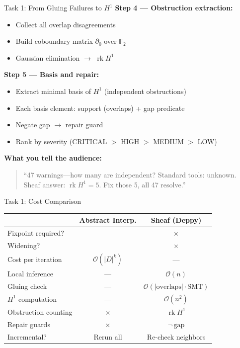 \documentclass[aspectratio=169,10pt]{beamer}
\newcommand{\yes}{\textcolor{good}{\checkmark}}
\newcommand{\no}{\textcolor{meh}{$\times$}}
\newcommand{\rk}{\operatorname{rk}}
\begin{document}
\begin{frame}{Task 1: From Gluing Failures to $H^1$}
\textbf{Step 4 --- Obstruction extraction:}
\begin{itemize}
  \item Collect all overlap disagreements
  \item Build coboundary matrix $\partial_0$ over $\mathbb{F}_2$
  \item Gaussian elimination $\to$ $\rk H^1$
\end{itemize}

\textbf{Step 5 --- Basis and repair:}
\begin{itemize}
  \item Extract minimal basis of $H^1$ (independent obstructions)
  \item Each basis element: support (overlaps) + gap predicate
  \item Negate gap $\to$ repair guard
  \item Rank by severity (CRITICAL $>$ HIGH $>$ MEDIUM $>$ LOW)
\end{itemize}

\textbf{What you tell the audience:}
\begin{quote}
``47 warnings---how many are independent? Standard tools: unknown. Sheaf answer: $\rk H^1 = 5$. Fix those 5, all 47 resolve.''
\end{quote}
\end{frame}

\begin{frame}{Task 1: Cost Comparison}
\begin{center}
\renewcommand{\arraystretch}{1.4}
\begin{tabular}{@{}p{4.5cm}cc@{}}
\toprule
& \textbf{Abstract Interp.} & \textbf{Sheaf (Deppy)} \\
\midrule
Fixpoint required? & \yes & \no \\
Widening? & \yes & \no \\
Cost per iteration & $\mathcal{O}(|D|^k)$ & --- \\
Local inference & --- & $\mathcal{O}(n)$ \\
Gluing check & --- & $\mathcal{O}(|\text{overlaps}| \cdot \text{SMT})$ \\
$H^1$ computation & --- & $\mathcal{O}(n^2)$ \\
Obstruction counting & \no & $\rk H^1$ \\
Repair guards & \no & $\lnot\,\text{gap}$ \\
Incremental? & Rerun all & Re-check neighbors \\
\bottomrule
\end{tabular}
\end{center}
\end{frame}
\end{document}
